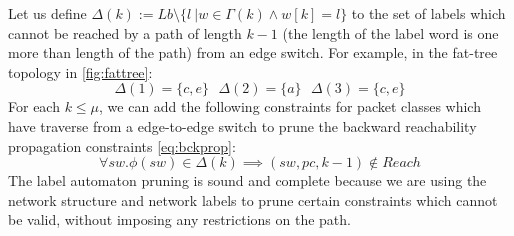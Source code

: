 Let us define $\Delta(k) := Lb \setminus \{l \ | w \in \Gamma(k) \wedge w[k] = l\}$ to the set of labels which cannot be reached by a path of length $k - 1$ (the length of the label word is one more than length of the path) from an edge switch. For example, in the fat-tree topology in \cref{fig:fattree}:
\[
\Delta(1) = \{c, e\} \ \ \ \Delta(2) = \{a\} \ \ \ \Delta(3) = \{c,e\}
\]
For each $k \leq \mu$, we can add the following constraints for packet classes which have traverse from a edge-to-edge switch to prune the backward reachability propagation constraints \cref{eq:bckprop}: 
\begin{equation}
	\forall sw. \phi(sw) \in \Delta(k) \implies (sw, pc, k -1) \notin Reach
\end{equation}
The label automaton pruning is sound and complete because we are using the network structure and network labels to prune certain constraints which cannot be valid, without imposing any restrictions on the path. 
